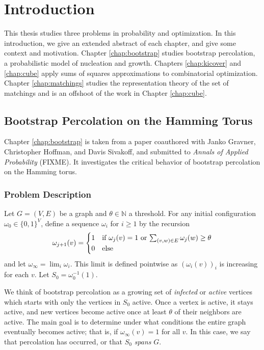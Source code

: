 

\chapter{Introduction}
\label{chap:introduction}

This thesis studies three problems in probability and optimization.
In this introduction, we give an extended abstract of each chapter, and give some context and motivation.
Chapter \ref{chap:bootstrap} studies bootstrap percolation, a probabilistic model of nucleation and growth.
Chapters \ref{chap:kicover} and \ref{chap:cube} apply sums of squares approximations to combinatorial optimization.
Chapter \ref{chap:matchings} studies the representation theory of the set of matchings and is an offshoot of the work in Chapter \ref{chap:cube}.

\section{Bootstrap Percolation on the Hamming Torus}
Chapter \ref{chap:bootstrap} is taken from a paper coauthored with Janko Gravner, Christopher Hoffman, and Davis Sivakoff, and submitted to \emph{Annals of Applied Probability} (FIXME).
It investigates the critical behavior of bootstrap percolation on the Hamming torus.

\subsection{Problem Description}
\label{section:bootstrap1}
Let $G = (V,E)$ be a graph and $\theta \in \mathbb{N}$ a threshold.
For any initial configuration $\omega_0 \in \{0,1\}^V$, define a sequence $\omega_i$ for $i \ge 1$ by the recursion
$$
\omega_{j+1}(v)=
\begin{cases}
1& \text{if $\omega_j(v)=1$ or $\sum_{(v,w) \in E}\omega_j(w) \geq
\theta$}\\
0 &\text{else}
\end{cases}
$$
and let $\omega_\infty = \lim_i \omega_i$. This limit is defined pointwise as $(\omega_i(v))_i$ is increasing for each $v$.
Let $S_0 = \omega_0^{-1}(1)$.

We think of bootstrap percolation as a growing set of {\em infected} or {\em active} vertices which starts with only the vertices in $S_0$ active.
Once a vertex is active, it stays active, and new vertices become active once at least $\theta$ of their neighbors are active.
The main goal is to determine under what conditions the entire graph eventually becomes active; that is, if $\omega_\infty(v) = 1$ for all $v$.
In this case, we say that percolation has occurred, or that $S_0$ {\em spans} $G$.


